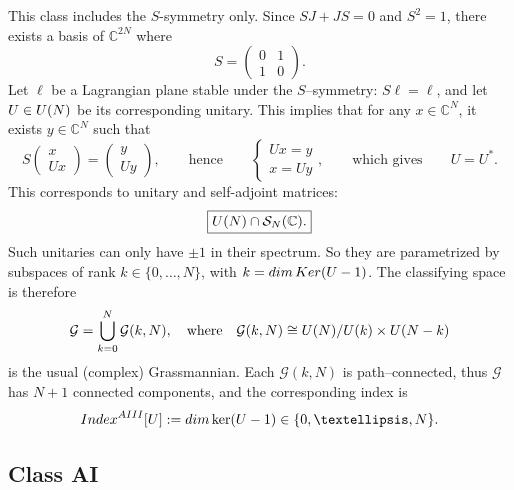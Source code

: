\documentclass[11pt]{amsart}
\numberwithin{equation}{section} %
\newcommand\1{{\mathds 1}}
\def\C{{\mathbb C}}
\def\CC{{\mathbb C}}
\def\cG{{\mathcal G}}
\def\cS{{\mathcal S}}
\def\rAIII{{\rm AIII}}
\def\U{{\rm U}}
\def\Index{{\rm Index}}
\def\Ker{{\rm Ker }}
\def\dim{{\rm dim }}
\begin{document}
This class includes the $S$-symmetry only. Since $SJ+JS=0$ and $S^2 = 1$, there exists a basis of $\C^{2N}$ where
$$
S = \begin{pmatrix}
 0 & 1 \\
1 & 0
\end{pmatrix}.
$$
Let $\ell$ be a Lagrangian plane stable under the $S$--symmetry: $S \ell = \ell$, and let $U \in \U(N)$ be its corresponding unitary. This implies that for any $x \in \CC^N$, it exists $y \in \CC^N$ such that
$$
S \begin{pmatrix}	x  \\	U x \end{pmatrix} = 
\begin{pmatrix} y  \\ U y \end{pmatrix}, \qquad \text{hence} \qquad
\begin{cases}
    Ux = y \\
    x = U y
\end{cases}, \qquad \text{which gives} \qquad
U = U^*.
$$
This corresponds to unitary and self-adjoint matrices:
\[
    \boxed{ \U(N) \cap \cS_N(\C). }
\]
Such unitaries can only have $\pm 1$ in their spectrum. So they are parametrized by subspaces of rank $k \in \{0, \ldots, N\}$, with $k  = \dim \, \Ker (U - 1)$. The classifying space is therefore
$$
\cG = \mathop{\bigcup}_{k=0}^N \cG(k,N), \quad \text{where} \quad
\cG(k,N) \cong \U(N) / \U(k) \times \U(N-k)
$$
is the usual (complex) Grassmannian. Each $\cG(k,N) $ is path--connected, thus $\cG$ has $N+1$ connected components, and the corresponding index is $$\Index^{\rAIII}[U] := \dim \ker(U-1) \in \{0,\ldots, N\}.$$

\subsection{Class AI}
\label{sec:class_AI}
\end{document}
